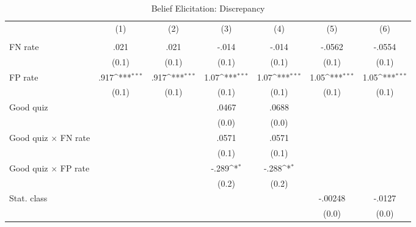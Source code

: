 \begin{table}[htbp]\centering
\def\sym#1{\ifmmode^{#1}\else\(^{#1}\)\fi}
\caption{Belief Elicitation: Discrepancy}
\begin{tabular}{l*{6}{c}}
\hline\hline
                &\multicolumn{1}{c}{(1)}&\multicolumn{1}{c}{(2)}&\multicolumn{1}{c}{(3)}&\multicolumn{1}{c}{(4)}&\multicolumn{1}{c}{(5)}&\multicolumn{1}{c}{(6)}\\
                &\multicolumn{1}{c}{}&\multicolumn{1}{c}{}&\multicolumn{1}{c}{}&\multicolumn{1}{c}{}&\multicolumn{1}{c}{}&\multicolumn{1}{c}{}\\
\hline
FN rate         &     .021         &     .021         &    -.014         &    -.014         &   -.0562         &   -.0554         \\
                &    (0.1)         &    (0.1)         &    (0.1)         &    (0.1)         &    (0.1)         &    (0.1)         \\
FP rate         &     .917\sym{***}&     .917\sym{***}&     1.07\sym{***}&     1.07\sym{***}&     1.05\sym{***}&     1.05\sym{***}\\
                &    (0.1)         &    (0.1)         &    (0.1)         &    (0.1)         &    (0.1)         &    (0.1)         \\
Good quiz       &                  &                  &    .0467         &    .0688         &                  &                  \\
                &                  &                  &    (0.0)         &    (0.0)         &                  &                  \\
Good quiz $\times$ FN rate&                  &                  &    .0571         &    .0571         &                  &                  \\
                &                  &                  &    (0.1)         &    (0.1)         &                  &                  \\
Good quiz $\times$ FP rate&                  &                  &    -.289\sym{*}  &    -.288\sym{*}  &                  &                  \\
                &                  &                  &    (0.2)         &    (0.2)         &                  &                  \\
Stat. class     &                  &                  &                  &                  &  -.00248         &   -.0127         \\
                &                  &                  &                  &                  &    (0.0)         &    (0.0)         \\

\end{tabular}
\end{table}
